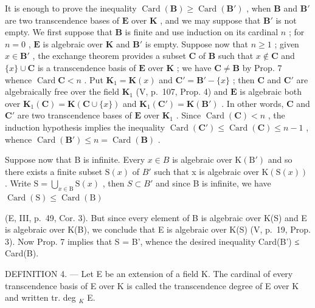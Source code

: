 It is enough to prove the inequality \(\operatorname{Card}(\mathbf{B}) \geqslant \operatorname{Card}(\mathbf{B}')\) , when \(\mathbf{B}\) and \(\mathbf{B}'\) are two transcendence bases of \(\mathbf{E}\) over \(\mathbf{K}\) , and we may suppose that \(\mathbf{B}'\) is not empty. We first suppose that \(\mathbf{B}\) is finite and use induction on its cardinal \(n\) ; for \(n = 0\) , \(\mathbf{E}\) is algebraic over \(\mathbf{K}\) and \(\mathbf{B}'\) is empty. Suppose now that \(n \geqslant 1\) ; given \(x \in \mathbf{B}'\) , the exchange theorem provides a subset \(\mathbf{C}\) of \(\mathbf{B}\) such that \(x \notin \mathbf{C}\) and \(\{x\} \cup \mathbf{C}\) is a transcendence basis of \(\mathbf{E}\) over \(\mathbf{K}\) ; we have \(\mathbf{C} \neq \mathbf{B}\) by Prop. 7 whence \(\operatorname{Card} \mathbf{C} < n\) . Put \(\mathbf{K}_1 = \mathbf{K}(x)\) and \(\mathbf{C}' = \mathbf{B}' - \{x\}\) ; then \(\mathbf{C}\) and \(\mathbf{C}'\) are algebraically free over the field \(\mathbf{K}_1\) (V, p.~107, Prop. 4) and \(\mathbf{E}\) is algebraic both over \(\mathbf{K}_1(\mathbf{C}) = \mathbf{K}(\mathbf{C} \cup \{x\})\) and \(\mathbf{K}_1(\mathbf{C}') = \mathbf{K}(\mathbf{B}')\) . In other words, \(\mathbf{C}\) and \(\mathbf{C}'\) are two transcendence bases of \(\mathbf{E}\) over \(\mathbf{K}_1\) . Since \(\operatorname{Card}(\mathbf{C}) < n\) , the induction hypothesis implies the inequality \(\operatorname{Card}(\mathbf{C}') \leqslant \operatorname{Card}(\mathbf{C}) \leqslant n - 1\) , whence \(\operatorname{Card}(\mathbf{B}') \leqslant n = \operatorname{Card}(\mathbf{B})\) .

Suppose now that B is infinite. Every \(x \in B\) is algebraic over \(\mathrm{K}(\mathrm{B}')\) and so there exists a finite subset \(\mathrm{S}(x)\) of \(B'\) such that x is algebraic over \(\mathrm{K}(\mathrm{S}(x))\) . Write \(\mathrm{S} = \bigcup_{x \in \mathrm{B}} \mathrm{S}(x)\) , then \(S \subset B'\) and since B is infinite, we have \(\operatorname{Card}(\mathrm{S}) \leqslant \operatorname{Card}(\mathrm{B})\)

(E, III, p.~49, Cor. 3). But since every element of B is algebraic over K(S) and E is algebraic over K(B), we conclude that E is algebraic over K(S) (V, p.~19, Prop. 3). Now Prop. 7 implies that S = B', whence the desired inequality Card(B') ≤ Card(B).

DEFINITION 4. --- Let E be an extension of a field K. The cardinal of every transcendence basis of E over K is called the transcendence degree of E over K and written tr. deg \(_{K}\) E.

